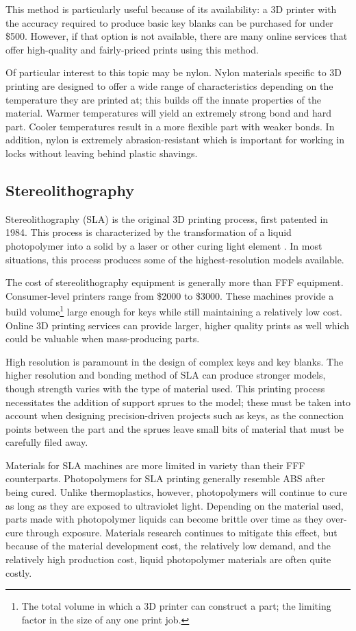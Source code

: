 \documentclass{acm_proc_article-sp}
\begin{document}
This method is particularly useful because of its availability: a 3D printer with the accuracy required to produce basic key blanks can be purchased for under \$500. However, if that option is not available, there are many online services that offer high-quality and fairly-priced prints using this method.

Of particular interest to this topic may be nylon. Nylon materials specific to 3D printing are designed to offer a wide range of characteristics depending on the temperature they are printed at; this builds off the innate properties of the material. Warmer temperatures will yield an extremely strong bond and hard part. Cooler temperatures result in a more flexible part with weaker bonds. In addition, nylon is extremely abrasion-resistant which is important for working in locks without leaving behind plastic shavings.

\subsection{Stereolithography}
Stereolithography (SLA) is the original 3D printing process, first patented in 1984. This process is characterized by the transformation of a liquid photopolymer into a solid by a laser or other curing light element \cite{HULL}. In most situations, this process produces some of the highest-resolution models available.

The cost of stereolithography equipment is generally more than FFF equipment. Consumer-level printers range from \$2000 to \$3000. These machines provide a build volume\footnote{The total volume in which a 3D printer can construct a part; the limiting factor in the size of any one print job.} large enough for keys while still maintaining a relatively low cost. Online 3D printing services can provide larger, higher quality prints as well which could be valuable when mass-producing parts.

High resolution is paramount in the design of complex keys and key blanks. The higher resolution and bonding method of SLA can produce stronger models, though strength varies with the type of material used. This printing process necessitates the addition of support sprues to the model; these must be taken into account when designing precision-driven projects such as keys, as the connection points between the part and the sprues leave small bits of material that must be carefully filed away.

Materials for SLA machines are more limited in variety than their FFF counterparts. Photopolymers for SLA printing generally resemble ABS after being cured. Unlike thermoplastics, however, photopolymers will continue to cure as long as they are exposed to ultraviolet light. Depending on the material used, parts made with photopolymer liquids can become brittle over time as they over-cure through exposure. Materials research continues to mitigate this effect, but because of the material development cost, the relatively low demand, and the relatively high production cost, liquid photopolymer materials are often quite costly.
\end{document}
